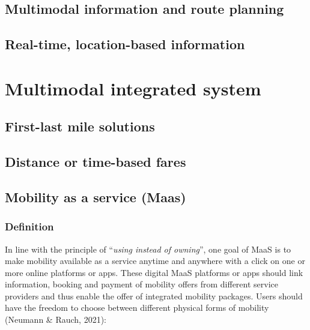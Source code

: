 \documentclass[
]{book}
\begin{document}
\hypertarget{multimodal-information-and-route-planning}{%
\section{Multimodal information and route planning}\label{multimodal-information-and-route-planning}}

\hypertarget{real-time-location-based-information}{%
\section{Real-time, location-based information}\label{real-time-location-based-information}}

\hypertarget{multimodal}{%
\chapter{Multimodal integrated system}\label{multimodal}}

\hypertarget{first-last-mile-solutions}{%
\section{First-last mile solutions}\label{first-last-mile-solutions}}

\hypertarget{distance-or-time-based-fares}{%
\section{Distance or time-based fares}\label{distance-or-time-based-fares}}

\hypertarget{mobility-as-a-service-maas}{%
\section{Mobility as a service (Maas)}\label{mobility-as-a-service-maas}}

\hypertarget{definition-6}{%
\subsection*{Definition}\label{definition-6}}

In line with the principle of ``\emph{using instead of owning}'', one goal of MaaS is to make mobility available as a service anytime and anywhere with a click on one or more online platforms or apps. These digital MaaS platforms or apps should link information, booking and payment of mobility offers from different service providers and thus enable the offer of integrated mobility packages. Users should have the freedom to choose between different physical forms of mobility (Neumann \& Rauch, 2021):
\end{document}

